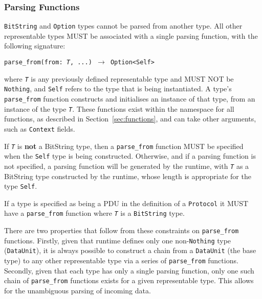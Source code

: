 \documentclass[10pt,twocolumn,a4paper]{article}
\newcommand{\code}[1]{\texttt{#1}}
\begin{document}
\subsubsection{Parsing Functions}
\label{sec:representable-parse}

\code{BitString} and \code{Option} types cannot be parsed from another
type. All other representable types MUST be associated with a single parsing
function, with the following signature:

\begin{center}
  \texttt{parse\_from(from: \emph{T}, ...) $\rightarrow$ Option<Self>}
\end{center}

where \code{\emph{T}} is any previously defined representable type and MUST NOT
be \code{Nothing}, and \code{Self} refers to the type that is being instantiated.
A type's \code{parse\_from} function constructs and initialises an instance of that
type, from an instance of the type \code{\emph{T}}. These functions exist within
the namespace for all functions, as described in Section~\ref{sec:functions}, and
can take other arguments, such as \code{Context} fields.

If \code{\emph{T}} is \textbf{not} a BitString type, then a \code{parse\_from} function
MUST be specified when the \code{Self} type is being constructed. Otherwise, and
if a parsing function is not specified,
a parsing function will be generated by the runtime, with
\code{\emph{T}} as a BitString type constructed by the runtime, whose length is
appropriate for the type \code{Self}.

If a type is specified as being a PDU in the definition of a \code{Protocol} it
MUST have a \code{parse\_from} function where \code{\emph{T}} is a \code{BitString}
type.

There are two properties that follow from these constraints on \code{parse\_from}
functions. Firstly, given that runtime defines only one non-\code{Nothing} type
(\code{DataUnit}), it is always possible to construct a chain from a
\code{DataUnit} (the base type) to any other representable type via a series of
\code{parse\_from} functions. Secondly, given that each type has only a single
parsing function, only one such chain of \code{parse\_from} functions exists for
a given representable type. This allows for the unambiguous parsing of incoming
data.

\end{document}
